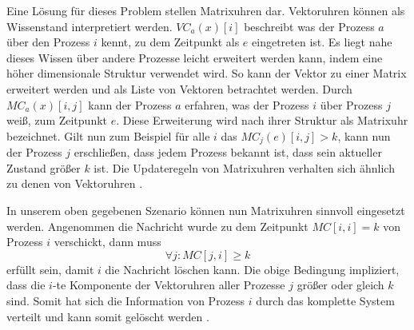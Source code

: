 Eine Lösung für dieses Problem stellen Matrixuhren dar.
Vektoruhren können als Wissenstand interpretiert werden.
$VC_a(x)[i]$ beschreibt was der Prozess $a$ über den Prozess $i$ kennt, zu dem Zeitpunkt als $e$ eingetreten ist.
Es liegt nahe dieses Wissen über andere Prozesse leicht erweitert werden kann, indem eine höher dimensionale Struktur verwendet wird.
So kann der Vektor zu einer Matrix erweitert werden und als Liste von Vektoren betrachtet werden.
Durch $MC_a(x)[i,j]$ kann der Prozess $a$ erfahren, was der Prozess $i$ über Prozess $j$ weiß, zum Zeitpunkt $e$.
Diese Erweiterung wird nach ihrer Struktur als Matrixuhr bezeichnet.
Gilt nun zum Beispiel für alle $i$ das $MC_j(e)[i, j] > k$, kann nun der Prozess $j$ erschließen, dass jedem Prozess bekannt ist, dass sein aktueller Zustand größer $k$ ist.
Die Updateregeln von Matrixuhren verhalten sich ähnlich zu denen von Vektoruhren \cite{garg2005concurrent}.

In unserem oben gegebenen Szenario können nun Matrixuhren sinnvoll eingesetzt werden.
Angenommen die Nachricht wurde zu dem Zeitpunkt $MC[i,i]=k$ von Prozess $i$ verschickt, dann muss
\begin{equation*}
\forall j \colon MC[j,i] \geq k
\end{equation*}
erfüllt sein, damit $i$ die Nachricht löschen kann.
Die obige Bedingung impliziert, dass die $i$-te Komponente der Vektoruhren aller Prozesse $j$ größer oder gleich $k$ sind.
Somit hat sich die Information von Prozess $i$ durch das komplette System verteilt und kann somit gelöscht werden \cite{garg2005concurrent}.


